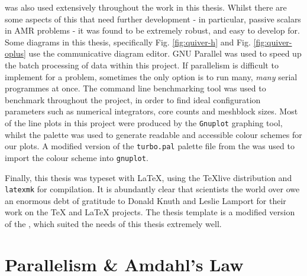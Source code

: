 \noindent
\athena{} \parencite{athena} was also used extensively throughout the work in this thesis.
Whilst there are some aspects of this that need further development - in particular, passive scalars in AMR problems - it was found to be extremely robust, and easy to develop for.
Some diagrams in this thesis, specifically Fig. \ref{fig:quiver-h} and Fig. \ref{fig:quiver-oplus} use the  communicative diagram editor.
GNU Parallel \parencite{tange_2021_5523272} was used to speed up the batch processing of data within this project.
If parallelism is difficult to implement for a problem, sometimes the only option is to run many, \textit{many} serial programmes at once.
The  command line benchmarking tool was used to benchmark \athena{} throughout the project, in order to find ideal configuration parameters such as numerical integrators, core counts and meshblock sizes.
Most of the line plots in this project were produced by the \texttt{Gnuplot} graphing tool, whilst the  palette was used to generate readable and accessible colour schemes for our plots.
A modified version of the \texttt{turbo.pal} palette file from the  was used to import the colour scheme into \texttt{gnuplot}.

Finally, this thesis was typeset with \LaTeX{}, using the {\TeX}live distribution and \texttt{latexmk} for compilation.
It is abundantly clear that scientists the world over owe an enormous debt of gratitude to Donald Knuth and Leslie Lamport for their work on the \TeX{} and \LaTeX{} projects.
The thesis template is a modified version of the , which suited the needs of this thesis extremely well.

\section{Parallelism \& Amdahl's Law}
\label{app:parallelism}

